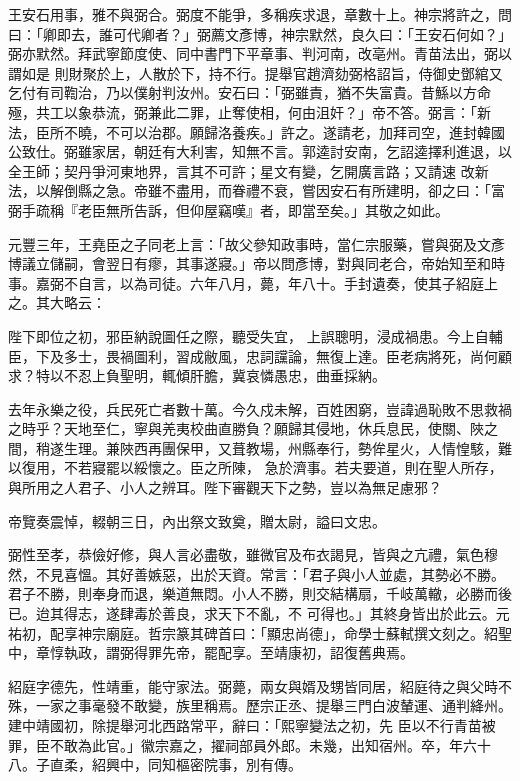 \begin{pinyinscope}
 王安石用事，雅不與弼合。弼度不能爭，多稱疾求退，章數十上。神宗將許之，問曰：「卿即去，誰可代卿者？」弼薦文彥博，神宗默然，良久曰：「王安石何如？」弼亦默然。拜武寧節度使、同中書門下平章事、判河南，改亳州。青苗法出，弼以謂如是
 則財聚於上，人散於下，持不行。提舉官趙濟劾弼格詔旨，侍御史鄧綰又乞付有司鞫治，乃以僕射判汝州。安石曰：「弼雖責，猶不失富貴。昔鯀以方命殛，共工以象恭流，弼兼此二罪，止奪使相，何由沮奸？」帝不答。弼言：「新法，臣所不曉，不可以治郡。願歸洛養疾。」許之。遂請老，加拜司空，進封韓國公致仕。弼雖家居，朝廷有大利害，知無不言。郭逵討安南，乞詔逵擇利進退，以全王師；契丹爭河東地界，言其不可許；星文有變，乞開廣言路；又請速
 改新法，以解倒縣之急。帝雖不盡用，而眷禮不衰，嘗因安石有所建明，卻之曰：「富弼手疏稱『老臣無所告訴，但仰屋竊嘆』者，即當至矣。」其敬之如此。



 元豐三年，王堯臣之子同老上言：「故父參知政事時，當仁宗服藥，嘗與弼及文彥博議立儲嗣，會翌日有瘳，其事遂寢。」帝以問彥博，對與同老合，帝始知至和時事。嘉弼不自言，以為司徒。六年八月，薨，年八十。手封遺奏，使其子紹庭上之。其大略云：



 陛下即位之初，邪臣納說圖任之際，聽受失宜，
 上誤聰明，浸成禍患。今上自輔臣，下及多士，畏禍圖利，習成敝風，忠詞讜論，無復上達。臣老病將死，尚何顧求？特以不忍上負聖明，輒傾肝膽，冀哀憐愚忠，曲垂採納。



 去年永樂之役，兵民死亡者數十萬。今久戍未解，百姓困窮，豈諱過恥敗不思救禍之時乎？天地至仁，寧與羌夷校曲直勝負？願歸其侵地，休兵息民，使關、陜之間，稍遂生理。兼陜西再團保甲，又葺教場，州縣奉行，勢侔星火，人情惶駭，難以復用，不若寢罷以綏懷之。臣之所陳，
 急於濟事。若夫要道，則在聖人所存，與所用之人君子、小人之辨耳。陛下審觀天下之勢，豈以為無足慮邪？



 帝覽奏震悼，輟朝三日，內出祭文致奠，贈太尉，謚曰文忠。



 弼性至孝，恭儉好修，與人言必盡敬，雖微官及布衣謁見，皆與之亢禮，氣色穆然，不見喜慍。其好善嫉惡，出於天資。常言：「君子與小人並處，其勢必不勝。君子不勝，則奉身而退，樂道無悶。小人不勝，則交結構扇，千岐萬轍，必勝而後已。迨其得志，遂肆毒於善良，求天下不亂，不
 可得也。」其終身皆出於此云。元祐初，配享神宗廟庭。哲宗篆其碑首曰：「顯忠尚德」，命學士蘇軾撰文刻之。紹聖中，章惇執政，謂弼得罪先帝，罷配享。至靖康初，詔復舊典焉。



 紹庭字德先，性靖重，能守家法。弼薨，兩女與婿及甥皆同居，紹庭待之與父時不殊，一家之事毫發不敢變，族里稱焉。歷宗正丞、提舉三門白波輦運、通判絳州。建中靖國初，除提舉河北西路常平，辭曰：「熙寧變法之初，先
 臣以不行青苗被罪，臣不敢為此官。」徽宗嘉之，擢祠部員外郎。未幾，出知宿州。卒，年六十八。子直柔，紹興中，同知樞密院事，別有傳。




\end{pinyinscope}
